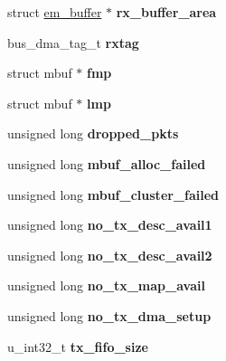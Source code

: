 \begin{DoxyCompactItemize}
struct \mbox{\hyperlink{structem__buffer}{em\+\_\+buffer}} $\ast$ {\bfseries rx\+\_\+buffer\+\_\+area}
\item 
\mbox{\label{structadapter_a2f36848e9d2699cfb32ae606d9892ea3}} 
bus\+\_\+dma\+\_\+tag\+\_\+t {\bfseries rxtag}
\item 
\mbox{\label{structadapter_a120ef1fbc7b3e99b02bf4526d632943f}} 
struct mbuf $\ast$ {\bfseries fmp}
\item 
\mbox{\label{structadapter_a3151045143a8362c7ba412c01343a4d3}} 
struct mbuf $\ast$ {\bfseries lmp}
\item 
\mbox{\label{structadapter_ad39ce0a265d64a40e730bce70d3e58ea}} 
unsigned long {\bfseries dropped\+\_\+pkts}
\item 
\mbox{\label{structadapter_aad79512c1a6046839bdcb9c9ac7d969f}} 
unsigned long {\bfseries mbuf\+\_\+alloc\+\_\+failed}
\item 
\mbox{\label{structadapter_ac467fa36278e22e0401a79e9b658f337}} 
unsigned long {\bfseries mbuf\+\_\+cluster\+\_\+failed}
\item 
\mbox{\label{structadapter_a3dec400b698b985518c741f014b5d9a7}} 
unsigned long {\bfseries no\+\_\+tx\+\_\+desc\+\_\+avail1}
\item 
\mbox{\label{structadapter_ad6458ea23b28e5a17a0f82a41ff9d3a2}} 
unsigned long {\bfseries no\+\_\+tx\+\_\+desc\+\_\+avail2}
\item 
\mbox{\label{structadapter_ac743ec17d0ba354b2476f88cbc91a8fb}} 
unsigned long {\bfseries no\+\_\+tx\+\_\+map\+\_\+avail}
\item 
\mbox{\label{structadapter_a134da25b5dc05acb86a1f0cb205683b7}} 
unsigned long {\bfseries no\+\_\+tx\+\_\+dma\+\_\+setup}
\item 
\mbox{\label{structadapter_a5027fc1f8e663cc2aa1b5bee26deb20f}} 
u\+\_\+int32\+\_\+t {\bfseries tx\+\_\+fifo\+\_\+size}
\item 

\end{DoxyCompactItemize}
